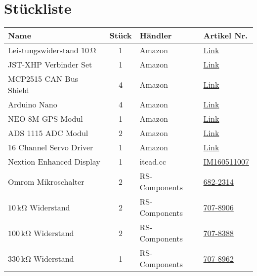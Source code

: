 \section{Stückliste}
\begin{table}[h]
    \centering
    \begin{threeparttable}
    \begin{tabular}{|l|c|M{3cm}|l|}
        \hline
    Name                         & Stück & Händler & Artikel Nr. \\\hline
    Leistungswiderstand $10\,\mathrm{\Omega}$ & 1 & Amazon & \href{https://www.amazon.de/-/en/sourcing-Aluminum-Housing-Mounted-Resistor/dp/B07H25VYM4/}{Link}\\
    JST-XHP Verbinder Set& 1 & Amazon & \href{https://www.amazon.de/dp/B07Q171W48/ref=cm_sw_r_cp_awdb_imm_t1_POHzFbSN8KAB1}{Link}\\ 
    MCP2515 CAN Bus Shield & 4 & Amazon & \href{https://www.amazon.de/-/en/AZDelivery-MCP2515-Shield-compatible-Arduino/dp/B086V3HLQ4}{Link}\\
    Arduino Nano           & 4 & Amazon & \href{https://www.amazon.de/gp/product/B078SBBST6}{Link}\\
    NEO-8M GPS Modul & 1 & Amazon & \href{https://www.amazon.de/-/en/gp/product/B07SQJ7Q6X}{Link}\\
    ADS 1115 ADC Modul & 2 & Amazon & \href{https://www.amazon.de/AZDelivery-ADS1115-Channels-Arduino-Raspberry/dp/B07QHWLTTS}{Link}\\
    16 Channel Servo Driver & 1 & Amazon & \href{https://www.amazon.de/Allrounder-PCA9685-Sunflower-16-Channel-Arduino-Raspberry/dp/B014KTSMLA}{Link}\\\hline
    Nextion Enhanced Display & 1 &  itead.cc & \href{https://www.itead.cc/nextion-nx8048k050.html}{IM160511007}\\\hline
    Omrom Mikroschalter & 2 & RS-Components & \href{https://at.rs-online.com/web/p/detektorschalter/6822314/}{682-2314}\\
    $10\,\mathrm{k\Omega}$ Widerstand & 2 & RS-Components &\href{https://at.rs-online.com/web/p/widerstande-durchsteckmontage/7078906/}{707-8906}\\
    $100\,\mathrm{k\Omega}$ Widerstand & 2 & RS-Components &\href{https://at.rs-online.com/web/p/widerstande-durchsteckmontage/7078388/}{707-8388}\\
    $330\,\mathrm{k\Omega}$ Widerstand & 1 & RS-Components &\href{https://at.rs-online.com/web/p/widerstande-durchsteckmontage/7078962/}{707-8962}\\

\end{tabular}
\end{threeparttable}
\end{table}

